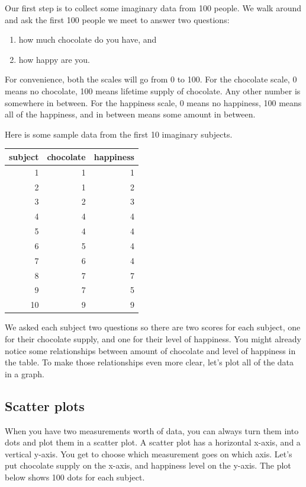 \documentclass[
]{book}
\providecommand{\tightlist}{%
  \setlength{\itemsep}{0pt}\setlength{\parskip}{0pt}}
\begin{document}
Our first step is to collect some imaginary data from 100 people. We walk around and ask the first 100 people we meet to answer two questions:

\begin{enumerate}
\def\labelenumi{\arabic{enumi}.}
\tightlist
\item
  how much chocolate do you have, and
\item
  how happy are you.
\end{enumerate}

For convenience, both the scales will go from 0 to 100. For the chocolate scale, 0 means no chocolate, 100 means lifetime supply of chocolate. Any other number is somewhere in between. For the happiness scale, 0 means no happiness, 100 means all of the happiness, and in between means some amount in between.

Here is some sample data from the first 10 imaginary subjects.

\begin{tabular}{r|r|r}
\hline
subject & chocolate & happiness\\
\hline
1 & 1 & 1\\
\hline
2 & 1 & 2\\
\hline
3 & 2 & 3\\
\hline
4 & 4 & 4\\
\hline
5 & 4 & 4\\
\hline
6 & 5 & 4\\
\hline
7 & 6 & 4\\
\hline
8 & 7 & 7\\
\hline
9 & 7 & 5\\
\hline
10 & 9 & 9\\
\hline
\end{tabular}

We asked each subject two questions so there are two scores for each subject, one for their chocolate supply, and one for their level of happiness. You might already notice some relationships between amount of chocolate and level of happiness in the table. To make those relationships even more clear, let's plot all of the data in a graph.

\subsection{Scatter plots}\label{scatter-plots}

When you have two measurements worth of data, you can always turn them into dots and plot them in a scatter plot. A scatter plot has a horizontal x-axis, and a vertical y-axis. You get to choose which measurement goes on which axis. Let's put chocolate supply on the x-axis, and happiness level on the y-axis. The plot below shows 100 dots for each subject.
\end{document}
